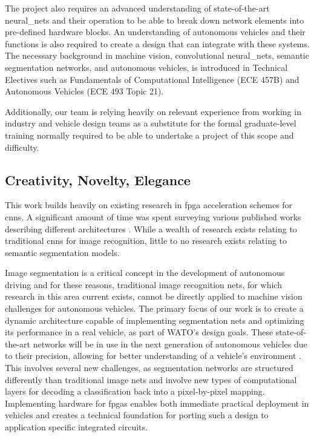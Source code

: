 \documentclass{uw-ece-wkrpt}
\begin{document}
The project also requires an advanced understanding of state-of-the-art \glspl{neural_net} and their operation to be able to break down network elements into pre-defined hardware blocks. An understanding of autonomous vehicles and their functions is also required to create a design that can integrate with these systems. The necessary background in machine vision, convolutional \glspl{neural_net}, semantic segmentation networks, and autonomous vehicles, is introduced in Technical Electives such as Fundamentals of Computational Intelligence (ECE 457B) and Autonomous Vehicles (ECE 493 Topic 21).

Additionally, our team is relying heavily on relevant experience from working in industry and vehicle design teams as a substitute for the formal graduate-level training normally required to be able to undertake a project of this scope and difficulty.

\subsection{Creativity, Novelty, Elegance}

This work builds heavily on existing research in \gls{fpga} acceleration schemes for \glspl{cnn}. A significant amount of time was spent surveying various published works describing different architectures \cite{Cheng2018Model-Compressi}. While a wealth of research exists relating to traditional \glspl{cnn} for image recognition, little to no research exists relating to semantic segmentation models.

Image segmentation is a critical concept in the development of autonomous driving and for these reasons, traditional image recognition nets, for which research in this area current exists, cannot be directly applied to machine vision challenges for autonomous vehicles. The primary focus of our work is to create a dynamic architecture capable of implementing segmentation nets and optimizing its performance in a real vehicle, as part of WATO's design goals. These state-of-the-art networks will be in use in the next generation of autonomous vehicles due to their precision, allowing for better understanding of a vehicle's environment \cite{Chen2019Importance-Awar}. This involves several new challenges, as segmentation networks are structured differently than traditional image nets and involve new types of computational layers for decoding a classification back into a pixel-by-pixel mapping. Implementing hardware for \glspl{fpga} enables both immediate practical deployment in vehicles and creates a technical foundation for porting such a design to application specific integrated circuits.
\end{document}
